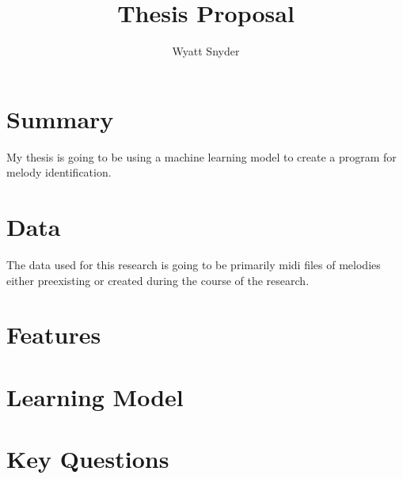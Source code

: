 \documentclass{article}
\title{Thesis Proposal}
\author{Wyatt Snyder}
\begin{document}
	\maketitle
	\section{Summary}
	My thesis is going to be using a machine learning model to create a program for melody identification.
	
	\section{Data}
	The data used for this research is going to be primarily midi files of melodies either preexisting or created during the course of the research. 
	
	\section{Features}
	
	
	\section{Learning Model}
	
	\section{Key Questions}
	
	
\end{document}
